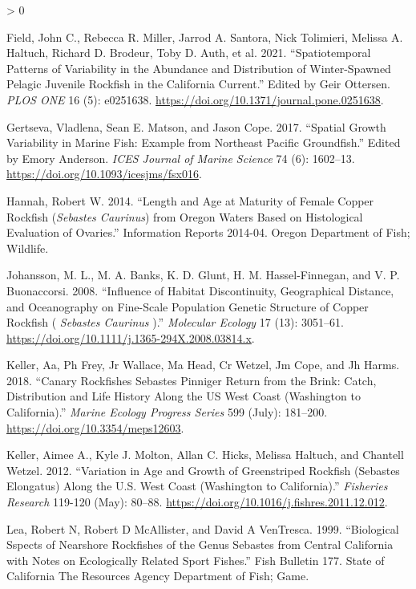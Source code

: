 \documentclass[11pt,
  english,
  a4paper,
]{article}
\newlength{\cslhangindent}
\newenvironment{CSLReferences}[2] %
 {%
  \setlength{\parindent}{0pt}
  \ifodd #1 \everypar{\setlength{\hangindent}{\cslhangindent}}\ignorespaces\fi
  \ifnum #2 > 0
  \setlength{\parskip}{#2\baselineskip}
  \fi
 }%
 {}
\begin{document}
\begin{CSLReferences}{1}{0}
\leavevmode\hypertarget{ref-field_spatiotemporal_2021}{}%
Field, John C., Rebecca R. Miller, Jarrod A. Santora, Nick Tolimieri, Melissa A. Haltuch, Richard D. Brodeur, Toby D. Auth, et al. 2021. {``Spatiotemporal Patterns of Variability in the Abundance and Distribution of Winter-Spawned Pelagic Juvenile Rockfish in the {California} {Current}.''} Edited by Geir Ottersen. \emph{PLOS ONE} 16 (5): e0251638. \url{https://doi.org/10.1371/journal.pone.0251638}.

\leavevmode\hypertarget{ref-gertseva_spatial_2017}{}%
Gertseva, Vladlena, Sean E. Matson, and Jason Cope. 2017. {``Spatial Growth Variability in Marine Fish: Example from {Northeast} {Pacific} Groundfish.''} Edited by Emory Anderson. \emph{ICES Journal of Marine Science} 74 (6): 1602--13. \url{https://doi.org/10.1093/icesjms/fsx016}.

\leavevmode\hypertarget{ref-hannah_length_2014}{}%
Hannah, Robert W. 2014. {``Length and Age at Maturity of Female Copper Rockfish (\emph{{Sebastes} Caurinus}) from {Oregon} Waters Based on Histological Evaluation of Ovaries.''} Information Reports 2014-04. Oregon Department of Fish; Wildlife.

\leavevmode\hypertarget{ref-johansson_influence_2008}{}%
Johansson, M. L., M. A. Banks, K. D. Glunt, H. M. Hassel-Finnegan, and V. P. Buonaccorsi. 2008. {``Influence of Habitat Discontinuity, Geographical Distance, and Oceanography on Fine-Scale Population Genetic Structure of Copper Rockfish ( \emph{{Sebastes} Caurinus} ).''} \emph{Molecular Ecology} 17 (13): 3051--61. \url{https://doi.org/10.1111/j.1365-294X.2008.03814.x}.

\leavevmode\hypertarget{ref-keller_canary_2018}{}%
Keller, Aa, Ph Frey, Jr Wallace, Ma Head, Cr Wetzel, Jm Cope, and Jh Harms. 2018. {``Canary Rockfishes {Sebastes} Pinniger Return from the Brink: Catch, Distribution and Life History Along the {US} West Coast ({Washington} to {California}).''} \emph{Marine Ecology Progress Series} 599 (July): 181--200. \url{https://doi.org/10.3354/meps12603}.

\leavevmode\hypertarget{ref-keller_variation_2012}{}%
Keller, Aimee A., Kyle J. Molton, Allan C. Hicks, Melissa Haltuch, and Chantell Wetzel. 2012. {``Variation in Age and Growth of Greenstriped Rockfish ({Sebastes} Elongatus) Along the {U}.{S}. West Coast ({Washington} to {California}).''} \emph{Fisheries Research} 119-120 (May): 80--88. \url{https://doi.org/10.1016/j.fishres.2011.12.012}.

\leavevmode\hypertarget{ref-lea_biological_1999}{}%
Lea, Robert N, Robert D McAllister, and David A VenTresca. 1999. {``Biological Sspects of Nearshore Rockfishes of the Genus Sebastes from {Central} {California} with Notes on Ecologically Related Sport Fishes.''} Fish Bulletin 177. State of California The Resources Agency Department of Fish; Game.


\end{CSLReferences}
\end{document}
